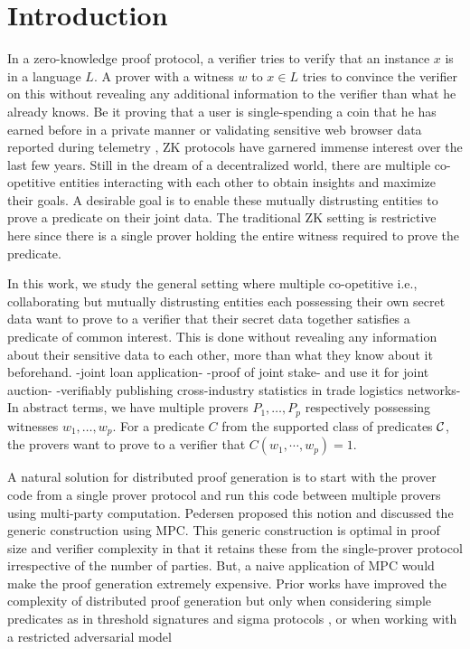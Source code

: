 \section{Introduction} \label{sec:intro}
In a zero-knowledge proof protocol, a verifier tries to verify that an instance $x$ is in a language $L$. A prover with a witness $w$ to $x \in L$ tries to convince the verifier on this without revealing any additional information to the verifier than what he already knows. Be it proving that a user is single-spending a coin that he has earned before in a private manner \cite{zerocash} or validating sensitive web browser data reported during telemetry \cite{MozillaPrio}, ZK protocols have garnered immense interest over the last few years. Still in the dream of a decentralized world, there are multiple co-opetitive entities interacting with each other to obtain insights and maximize their goals. A desirable goal is to enable these mutually distrusting entities to prove a predicate on their joint data. The traditional ZK setting is restrictive here since there is a single prover holding the entire witness required to prove the predicate. 

In this work, we study the general setting where multiple co-opetitive i.e., collaborating but mutually distrusting entities each possessing their own secret data want to prove to a verifier that their secret data together satisfies a predicate of common interest. This is done without revealing any information about their sensitive data to each other, more than what they know about it beforehand. 
-joint loan application-
-proof of joint stake- and use it for joint auction-
-verifiably publishing cross-industry statistics in trade logistics networks-
In abstract terms, we have multiple provers $P_1, \ldots, P_p$ respectively possessing witnesses $w_1, \ldots, w_p$. For a predicate $C$ from the supported class of predicates ${\cal C}$, the provers want to prove to a verifier that $C(w_1,\cdots,w_p) = 1$.

A natural solution for distributed proof generation is to start with the prover code from a single prover protocol and run this code between multiple provers using multi-party computation. Pedersen \cite{Ped92} proposed this notion and discussed the generic construction using MPC.
This generic construction is optimal in proof size and verifier complexity in that it retains these from the single-prover protocol irrespective of the number of parties. But, a naive application of MPC would make the proof generation extremely expensive.  
Prior works have improved the complexity of distributed proof generation but only when considering simple predicates as in threshold signatures \cite{} and sigma protocols \cite{EfficientTZ}, or when working with a restricted adversarial model \cite{trinocchio}

